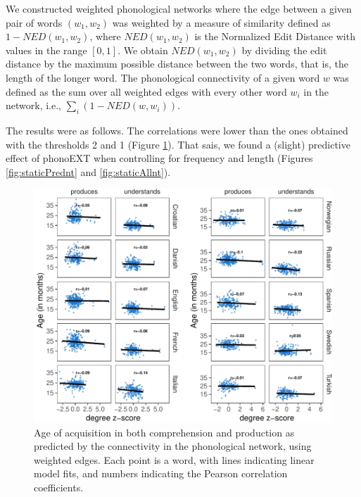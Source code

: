\documentclass[english,,man,floatsintext]{apa6}
\begin{document}
We constructed weighted phonological networks where the edge between a given pair of words \((w_1, w_2)\) was weighted by a measure of similarity defined as \(1-NED(w_1,w_2)\), where \(NED(w_1,w_2)\) is the Normalized Edit Distance with values in the range \([0,1]\). We obtain \(NED(w_1,w_2)\) by dividing the edit distance by the maximum possible distance between the two words, that is, the length of the longer word. The phonological connectivity of a given word \(w\) was defined as the sum over all weighted edges with every other word \(w_i\) in the network, i.e., \(\sum_{i} (1-NED(w,w_i))\).

The results were as follows. The correlations were lower than the ones obtained with the thresholds 2 and 1 (Figure \ref{fig:corrPlotnt}). That sais, we found a (slight) predictive effect of phonoEXT when controlling for frequency and length (Figures \ref{fig:staticPrednt} and \ref{fig:staticAllnt}).

\begin{figure}[!h]
\includegraphics[width=\textwidth]{ms_files/figure-latex/corrPlotnt-1} \caption{Age of acquisition in both comprehension and production as predicted by the connectivity in the phonological network, using weighted edges. Each point is a word, with lines indicating linear model fits, and numbers indicating the Pearson correlation coefficients.}\label{fig:corrPlotnt}
\end{figure}
\end{document}
